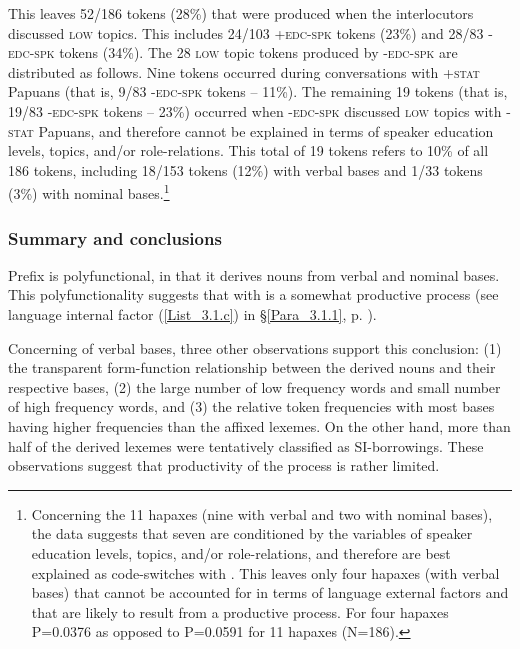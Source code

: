 This leaves 52/186 tokens (28\%) that were produced when the interlocutors discussed \textsc{low} topics. This includes 24/103 \textsc{+edc-spk} tokens (23\%) and 28/83 \textsc{-edc-spk} tokens (34\%). The 28 \textsc{low} topic tokens produced by \textsc{-edc-spk} are distributed as follows. Nine tokens occurred during conversations with \textsc{+stat} Papuans (that is, 9/83 \textsc{-edc-spk} tokens – 11\%). The remaining 19 tokens (that is, 19/83 \textsc{-edc-spk} tokens – 23\%) occurred when \textsc{-edc-spk} discussed \textsc{low} topics with \textsc{-stat} Papuans, and therefore cannot be explained in terms of speaker education levels, topics, and/or role-relations. This total of 19 tokens refers to 10\% of all 186 tokens, including 18/153 tokens (12\%) with verbal bases and 1/33 tokens (3\%) with nominal bases.\footnote{Concerning the 11 hapaxes (nine with verbal and two with nominal bases), the data suggests that seven are conditioned by the variables of speaker education levels, topics, and/or role-relations, and therefore are best explained as code-switches with . This leaves only four hapaxes (with verbal bases) that cannot be accounted for in terms of language external factors and that are likely to result from a productive  process. For four hapaxes P=0.0376 as opposed to P=0.0591 for 11 hapaxes (N=186).}


\subsubsection[Summary and conclusions]{Summary and conclusions}\label{Para_3.1.4.5}

\largerpage
Prefix  is polyfunctional, in that it derives nouns from verbal and nominal bases. This polyfunctionality suggests that  with  is a somewhat productive process (see language internal factor (\ref{List_3.1.c}) in §\ref{Para_3.1.1}, p. \pageref{List_3.1.c}).



Concerning  of verbal bases, three other observations support this conclusion: (1) the transparent form-function relationship between the derived nouns and their respective bases, (2) the large number of low frequency words and small number of high frequency words, and (3) the relative token frequencies with most bases having higher frequencies than the affixed lexemes. On the other hand, more than half of the derived lexemes were tentatively classified as SI-borrowings. These observations suggest that productivity of the  process is rather limited.



